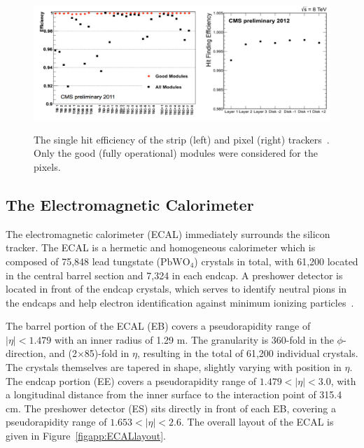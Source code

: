 \begin{figure}[!Hh]
       \centering
       \includegraphics[scale=0.4]{Figures/TrackerHitEfficiency.png} \\
       \caption[The hit efficiency of the CMS tracker.]{The single hit efficiency of the strip (left) and pixel (right) trackers~\cite{STRIPtracker}.  Only the good (fully operational) modules were considered for the pixels.}
\label{figapp:TrackerHitEfficiency}
\end{figure}


\subsection{The Electromagnetic Calorimeter}
\label{ecal}

The electromagnetic calorimeter (ECAL) immediately surrounds the silicon tracker.  The ECAL is a hermetic and homogeneous calorimeter which is composed of 75,848 lead tungstate ($\text{PbWO}_4$) crystals in total, with 61,200 located in the central barrel section and 7,324 in each endcap.  A preshower detector is located in front of the endcap crystals, which serves to identify neutral pions in the endcaps and help electron identification against minimum ionizing particles~\cite{CMStdr}.  


The barrel portion of the ECAL (EB) covers a pseudorapidity range of $|\eta| < 1.479$ with an inner radius of 1.29 m.  The granularity is 360-fold in the $\phi$-direction, and (2$\times$85)-fold in $\eta$, resulting in the total of 61,200 individual crystals.  The crystals themselves are tapered in shape, slightly varying with position in $\eta$.  The endcap portion (EE) covers a pseudorapidity range of $1.479 < |\eta| < 3.0$, with a longitudinal distance from the inner surface to the interaction point of 315.4 cm.  The preshower detector (ES) sits directly in front of each EB, covering a pseudorapidity range of $1.653 < |\eta| < 2.6$. The overall layout of the ECAL is given in Figure~\ref{figapp:ECALlayout}.  




